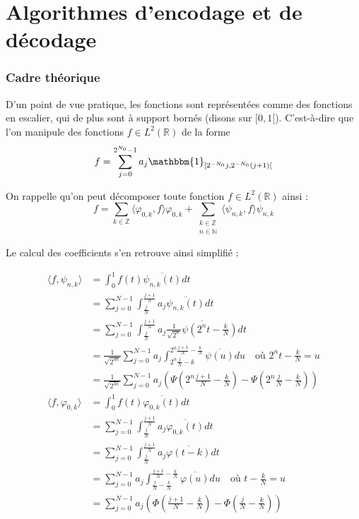 
\newpage

\part{Algorithmes d'encodage et de décodage}

\section{Cadre théorique}

D'un point de vue pratique, les fonctions sont représentées comme des fonctions en escalier, qui de plus sont à support bornés (disons sur $[0, 1[$). C'est-à-dire que l'on manipule des fonctions $f \in L^2(\mathbb{R})$ de la forme $$f = \sum_{j = 0}^{2^{N_0} - 1} a_j \mathbbm{1}_{[2^{-N_0}j, 2^{-N_0}(j+1)[}$$


On rappelle qu'on peut décomposer toute fonction $f \in L^2(\mathbb{R})$ ainsi : $$f = \sum_{k \in \mathbb{Z}} \langle \varphi_{0,k}, f \rangle \varphi_{0,k} + \sum_{\substack{k \in \mathbb{Z} \\ n \in \mathbb{N}}} \langle \psi_{n, k}, f \rangle \psi_{n, k}$$

Le calcul des coefficients s'en retrouve ainsi simplifié :

\begin{align*}
	\langle f, \psi_{n, k} \rangle &= \int_0^1 f(t) \overline{\psi_{n, k}(t)} dt \\
	&= \sum_{j=0}^{N-1} \int_{\frac j N}^{\frac{j+1}N} a_j \overline{\psi_{n, k}(t)} dt \\
	&= \sum_{j=0}^{N-1} \int_{\frac j N}^{\frac{j+1}N} a_j \overline{\frac{1}{\sqrt{2^n}} \psi(2^n t - \frac{k}{N})} dt \\
	&= \frac{1}{\sqrt{2^{3n}}} \sum_{j=0}^{N-1} a_j \int_{2^n \frac{j}N - k}^{2^n\frac{j+1}N - \frac{k}{N}} \overline{\psi(u)} du \quad \text{où $2^nt - \frac{k}{N} = u$} \\
	&= \frac{1}{\sqrt{2^{3n}}} \sum_{j=0}^{N-1} a_j \left(\Psi\left(2^n\frac{j+1}N - \frac{k}{N}\right) - \Psi\left(2^n\frac{j}N - \frac{k}{N}\right)\right) \\
	\langle f, \varphi_{0, k} \rangle &= \int_0^1 f(t) \overline{\varphi_{0, k}(t)} dt \\
	&= \sum_{j=0}^{N-1} \int_{\frac j N}^{\frac{j+1}N} a_j \overline{\varphi_{0, k}(t)} dt \\
	&= \sum_{j=0}^{N-1} \int_{\frac j N}^{\frac{j+1}N} a_j \overline{\varphi(t - k)} dt \\
	&= \sum_{j=0}^{N-1} a_j \int_{\frac{j}N - \frac{k}{N}}^{\frac{j+1}N - \frac{k}{N}} \overline{\varphi(u)} du \quad \text{où $t - \frac{k}{N} = u$} \\
	&= \sum_{j=0}^{N-1} a_j \left(\Phi\left(\frac{j+1}N - \frac{k}{N}\right) - \Phi\left(\frac{j}N - \frac{k}{N}\right)\right)
\end{align*}

